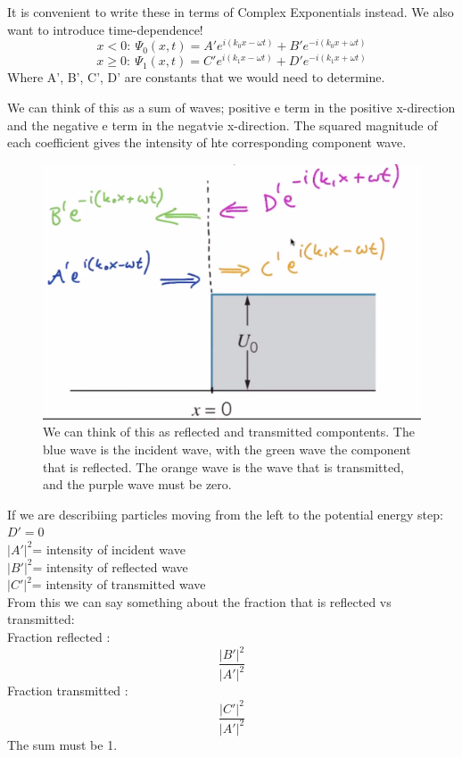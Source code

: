 \documentclass[class=article,crop=false]{standalone}
\begin{document}
It is convenient to write these in terms of Complex Exponentials instead. We also want to introduce time-dependence!
$$ x < 0:\ \Psi_0(x,t) = A'e^{i(k_0x-\omega t)} + B'e^{-i(k_0x+\omega t)} $$
$$ x \geq 0:\ \Psi_1(x,t) = C'e^{i(k_1x-\omega t)} + D'e^{-i(k_1x+\omega t)} $$
Where A', B', C', D' are constants that we would need to determine.

We can think of this as a sum of waves; positive e term in the positive x-direction and the negative e term in the negatvie x-direction. The squared magnitude of each coefficient gives the intensity of hte corresponding component wave.


\begin{figure}[h!]
	\centering
	\includegraphics[width=1\linewidth]{./Images/ref_tra_comp.png}
	\caption{We can think of this as reflected and transmitted compontents. The blue wave is the incident wave, with the green wave the component that is reflected. The orange wave is the wave that is transmitted, and the purple wave must be zero.}
\end{figure}

If we are describiing particles moving from the left to the potential energy step:
$ D' = 0 $ \\
$ |A'|^2 $= intensity of incident wave \\
$ |B'|^2 $= intensity of reflected wave \\
$ |C'|^2 $= intensity of transmitted wave \\

From this we can say something about the fraction that is reflected vs transmitted:\\
Fraction reflected :
$$ \frac{|B'|^2}{|A'|^2} $$
Fraction transmitted :
$$ \frac{|C'|^2}{|A'|^2} $$
The sum must be 1.
\end{document}
